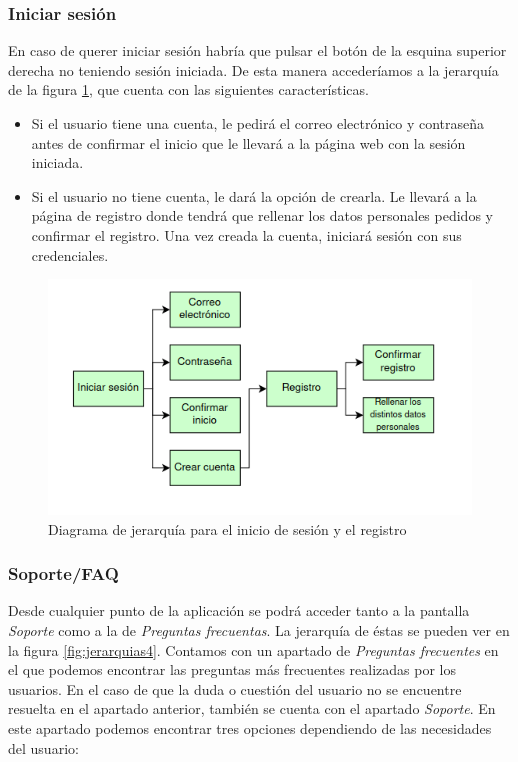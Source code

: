 \subsubsection{Iniciar sesión}

En caso de querer iniciar sesión habría que pulsar el botón de la esquina superior derecha no teniendo
sesión iniciada. De esta manera accederíamos a la jerarquía de la figura \ref{fig:jerarquias3}, que
cuenta con las siguientes características.

\begin{itemize}
      \item Si el usuario tiene una cuenta, le pedirá el correo electrónico y contraseña antes
            de confirmar el inicio que le llevará a la página web con la sesión iniciada.
      \item Si el usuario no tiene cuenta, le dará la opción de crearla. Le llevará a la página
            de registro donde tendrá que rellenar los datos personales pedidos y confirmar el
            registro. Una vez creada la cuenta, iniciará sesión con sus credenciales.
\end{itemize}

\begin{figure}
      \centering
      \includegraphics[width=0.8\linewidth]{./Imagenes/jerarquia-registro.png}
      \caption{Diagrama de jerarquía para el inicio de sesión y el registro}
      \label{fig:jerarquias3}
\end{figure}

\subsubsection{Soporte/FAQ}

Desde cualquier punto de la aplicación se podrá acceder tanto a la pantalla \textit{Soporte} como
a la de \textit{Preguntas frecuentas}. La jerarquía de éstas se pueden ver en la figura \ref{fig:jerarquias4}.
Contamos con un apartado de \textit{Preguntas frecuentes} en el que podemos encontrar las preguntas
más frecuentes realizadas por los usuarios. En el caso de que la duda o cuestión del usuario no se
encuentre resuelta en el apartado anterior, también se cuenta con el apartado \textit{Soporte}. En
este apartado podemos encontrar tres opciones dependiendo de las necesidades del usuario:

